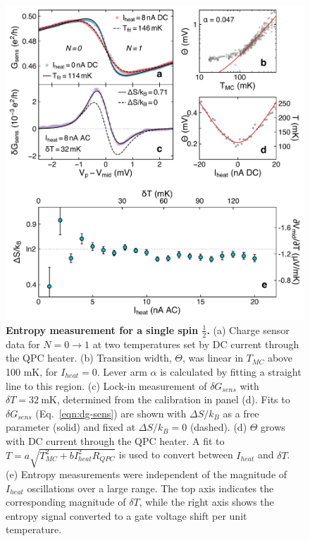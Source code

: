\documentclass[twocolumn,showpacs,amsmath,amssymb,prl,aps,superscriptaddress]{revtex4-1}
\begin{document}
\begin{figure}[!]
        \includegraphics[width=1.0\columnwidth]{../figures/figure_2.pdf}
        \caption{\label{fig:fig2} \textbf{Entropy measurement for a single spin $\frac{1}{2}$.} (a) Charge sensor data for $N=0 \rightarrow 1$ at two temperatures set by DC current through the QPC heater. (b) Transition width, $\Theta$, was linear in $T_{MC}$ above 100 mK, for $I_{heat}=0$. Lever arm $\alpha$ is calculated by fitting a straight line to this region.  (c) Lock-in measurement of $\delta G_{sens}$ with $\delta T = \SI{32}{\milli\kelvin}$, determined from the calibration in panel (d). Fits to $\delta G_{sens}$ (Eq.~\ref{eqn:dg-sens}) are shown with $\Delta S / k_B$  as a free parameter (solid) and fixed at $\Delta S / k_B=0$ (dashed). (d) $\Theta$ grows with DC current through the QPC heater. A fit to $T = a\sqrt{T^{2}_{MC}+b I^2_{heat}R_{QPC}}$ is used to convert between $I_{heat}$ and $\delta T$\cite{Mittal1996}. (e)  Entropy measurements were independent of the magnitude of $I_{heat}$ oscillations over a large range. The top axis indicates the corresponding magnitude of $\delta T$, while the right axis shows the entropy signal converted to a gate voltage shift per unit temperature.}
\end{figure}
\end{document}
